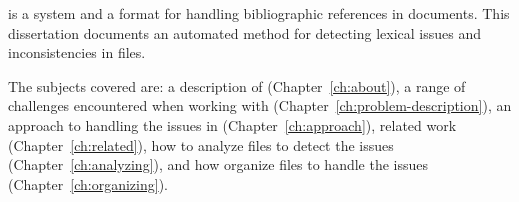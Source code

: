 {\bibtex} is a system and a format for handling bibliographic
references in documents. This dissertation documents an automated
method for detecting lexical issues and inconsistencies in {\bibtex}
files.

The subjects covered are: a description of {\bibtex}
(Chapter~\ref{ch:about}), a range of challenges encountered when
working with {\bibtex} (Chapter~\ref{ch:problem-description}), an
approach to handling the issues in {\bibtex}
(Chapter~\ref{ch:approach}), related work (Chapter~\ref{ch:related}),
how to analyze {\bibtex} files to detect the issues
(Chapter~\ref{ch:analyzing}), and how organize {\bibtex} files to
handle the issues (Chapter~\ref{ch:organizing}).
